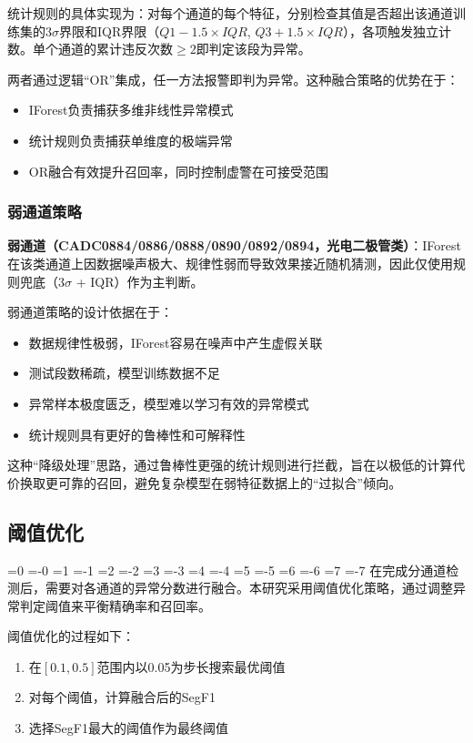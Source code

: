 \documentclass[12pt, a4paper]{article}
\newcommand{\zihao}[1]{%
    \ifnum#1=0 {\fontsize{42pt}{50pt}\selectfont}%
    \else\ifnum#1=-0 {\fontsize{36pt}{44pt}\selectfont}%
    \else\ifnum#1=1 {\fontsize{26pt}{32pt}\selectfont}%
    \else\ifnum#1=-1 {\fontsize{24pt}{28pt}\selectfont}%
    \else\ifnum#1=2 {\fontsize{22pt}{26pt}\selectfont}%
    \else\ifnum#1=-2 {\fontsize{18pt}{22pt}\selectfont}%
    \else\ifnum#1=3 {\fontsize{16pt}{20pt}\selectfont}%
    \else\ifnum#1=-3 {\fontsize{15pt}{18pt}\selectfont}%
    \else\ifnum#1=4 {\fontsize{14pt}{17pt}\selectfont}%
    \else\ifnum#1=-4 {\fontsize{12pt}{15pt}\selectfont}%
    \else\ifnum#1=5 {\fontsize{10.5pt}{13pt}\selectfont}%
    \else\ifnum#1=-5 {\fontsize{9pt}{11pt}\selectfont}%
    \else\ifnum#1=6 {\fontsize{7.5pt}{9pt}\selectfont}%
    \else\ifnum#1=-6 {\fontsize{6.5pt}{8pt}\selectfont}%
    \else\ifnum#1=7 {\fontsize{5.5pt}{7pt}\selectfont}%
    \else\ifnum#1=-7 {\fontsize{5pt}{6pt}\selectfont}%
    \fi\fi\fi\fi\fi\fi\fi\fi\fi\fi\fi\fi\fi\fi\fi\fi
}
\newcommand{\songti}{\CJKfontspec{SimSun}}
\begin{document}
统计规则的具体实现为：对每个通道的每个特征，分别检查其值是否超出该通道训练集的$3\sigma$界限和IQR界限（$Q1-1.5\times IQR$, $Q3+1.5\times IQR$），各项触发独立计数。单个通道的累计违反次数$\geq 2$即判定该段为异常。

两者通过逻辑``OR''集成，任一方法报警即判为异常。这种融合策略的优势在于：
\begin{itemize}
    \item IForest负责捕获多维非线性异常模式
    \item 统计规则负责捕获单维度的极端异常
    \item OR融合有效提升召回率，同时控制虚警在可接受范围
\end{itemize}

\subsubsection{弱通道策略}

\textbf{弱通道（CADC0884/0886/0888/0890/0892/0894，光电二极管类）}：IForest在该类通道上因数据噪声极大、规律性弱而导致效果接近随机猜测，因此仅使用规则兜底（$3\sigma$ + IQR）作为主判断。

弱通道策略的设计依据在于：
\begin{itemize}
    \item 数据规律性极弱，IForest容易在噪声中产生虚假关联
    \item 测试段数稀疏，模型训练数据不足
    \item 异常样本极度匮乏，模型难以学习有效的异常模式
    \item 统计规则具有更好的鲁棒性和可解释性
\end{itemize}

这种``降级处理''思路，通过鲁棒性更强的统计规则进行拦截，旨在以极低的计算代价换取更可靠的召回，避免复杂模型在弱特征数据上的``过拟合''倾向。

\subsection{阈值优化}

\zihao{5}\songti
在完成分通道检测后，需要对各通道的异常分数进行融合。本研究采用阈值优化策略，通过调整异常判定阈值来平衡精确率和召回率。

阈值优化的过程如下：
\begin{enumerate}[label=(\arabic*)]
    \item 在$[0.1, 0.5]$范围内以0.05为步长搜索最优阈值
    \item 对每个阈值，计算融合后的SegF1
    \item 选择SegF1最大的阈值作为最终阈值
\end{enumerate}
\end{document}

